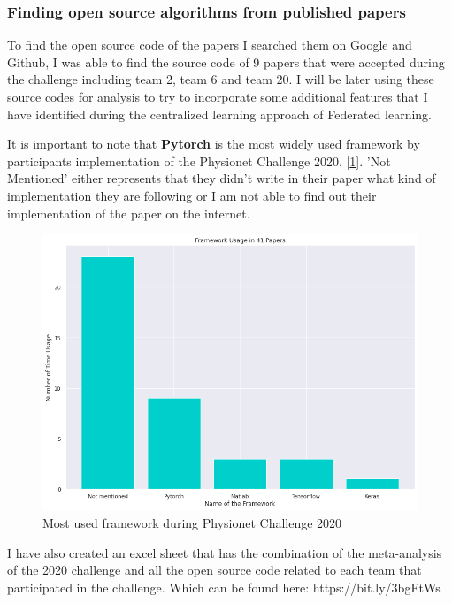 \subsubsection{Finding open source algorithms from published papers}

To find the open source code of the papers I searched them on Google and Github, I was able to find the source code of 9 papers that were accepted during the challenge including team 2, team 6 and team 20. I will be later using these source codes for analysis to try to incorporate some additional features that I have identified during the centralized learning approach of Federated learning. 

It is important to note that \textbf{Pytorch} is the most widely used framework by participants implementation of the Physionet Challenge 2020. [\ref{fig:framework_used_by_2020_teams}]. 'Not Mentioned' either represents that they didn't write in their paper what kind of implementation they are following or I am not able to find out their implementation of the paper on the internet. 

\begin{figure}[H]
\centering
\includegraphics[scale=0.5]{img/framework_usage_in_papers.png}
\caption{Most used framework during Physionet Challenge 2020}
\label{fig:framework_used_by_2020_teams}
\end{figure}

I have also created an excel sheet that has the combination of the meta-analysis of the 2020 challenge \cite{main_arythmia_detection} and all the open source code related to each team that participated in the challenge. Which can be found here: https://bit.ly/3bgFtWs 


